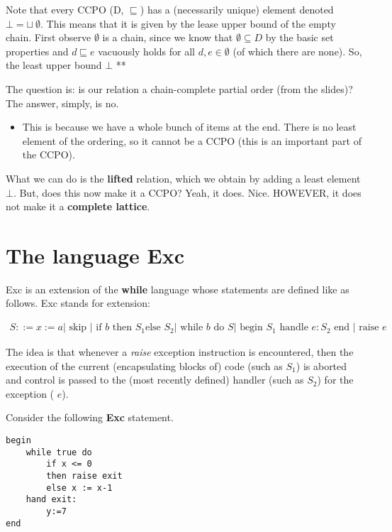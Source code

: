\documentclass[11pt,a4paper,titlepage,dvipsnames,cmyk]{scrartcl}
\begin{document}
Note that every CCPO (D, $\sqsubseteq$) has a (necessarily unique) element
denoted $\bot = \sqcup \ \emptyset$. This means that it is given by the
lease upper bound of the empty chain. First observe $\emptyset$ is a
chain, since we know that $\emptyset \subseteq D$ by the basic set
properties and $d \sqsubseteq e$ vacuously holds for all $d,e \in
\emptyset$ (of which there are none). So, the least upper bound $\bot$ **

The question is: is our relation a chain-complete partial order (from the
slides)? The answer, simply, is no.
\begin{itemize}
    \item This is because we have a whole bunch of items at the end. There
        is no least element of the ordering, so it cannot be a CCPO (this
        is an important part of the CCPO).
\end{itemize}

What we can do is the \textbf{lifted} relation, which we obtain by adding
a least element $\bot$. But, does this now make it a CCPO? Yeah, it does.
Nice. HOWEVER, it does not make it a \textbf{complete lattice}.

\section{The language Exc}%
\label{sec:exc-language}
Exc is an extension of the \textbf{while} language whose statements are
defined like as follows. Exc stands for extension:

\begin{align*}
    S ::= x := a | \text{ skip } | \text{ if }b\text{ then } S_1 \text{
    else } S_2 | \text{ while } b \text{ do } S | \text{ begin } S_1
    \text{ handle } e : S_2 \text{ end } | \text{ raise } e
\end{align*}

The idea is that whenever a {\color{green} \textit{raise}} exception
instruction is encountered, then the execution of the current
(encapsulating blocks of) code (such as {\color{blue} $S_1$}) is aborted
and control is passed to the (most recently defined) handler (such as
{\color{blue} $S_2$}) for the exception ({\color{blue} $e$}).

Consider the following \textbf{Exc} statement.
\begin{lstlisting}
begin
    while true do
        if x <= 0
        then raise exit
        else x := x-1
    hand exit:
        y:=7
end
\end{lstlisting}
\end{document}
